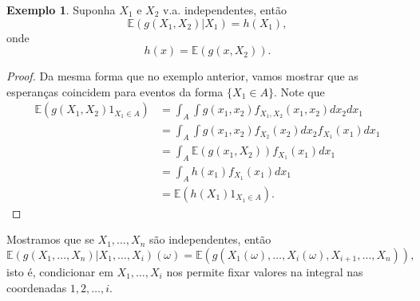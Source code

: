 \documentclass[12pt,a4paper,oneside]{book}
\theoremstyle{definition}
\newtheorem{example}[theorem]{Exemplo}
\theoremstyle{remark}
\numberwithin{equation}{section}
\newcommand{\E}{\mathbb{E}}
\newcommand{\pr}{\mathbb{P}}
\begin{document}
\begin{example}\label{exmp-condit-X1X2indp}
Suponha $X_1$ e $X_2$ v.a. independentes, então
$$\E(g(X_1,X_2)|X_1) = h(X_1), $$
onde 
$$h(x) = \E(g(x,X_2)).$$

\begin{proof}
Da mesma forma que no exemplo anterior, vamos mostrar que as esperanças coincidem para eventos da forma $\{ X_1\in A  \}$. Note que
\begin{align*}
\E(g(X_1,X_2)1_{X_1\in A}) &=  \int_A\int g(x_1,x_2)f_{X_1,X_2}(x_1,x_2)dx_2dx_1\\
	    &=  \int_A\int g(x_1,x_2)f_{X_2}(x_2)dx_2f_{X_1}(x_1)dx_1\\
        &=\int_A\E(g(x_1,X_2))f_{X_1}(x_1) dx_1\\        
        &= \int_A h(x_1)f_{X_1}(x_1)dx_1\\
        &=\E(h(X_1)1_{X_1\in A}).
\end{align*}

\end{proof}


\begin{tcolorbox}[colback = yellow!60]
Mostramos que se $X_1,\dots,X_n$ são independentes, então
$$\E(g(X_1,\dots,X_n)|X_1,\dots,X_i)(\omega) = \E(g(X_1(\omega),\dots,X_i(\omega),X_{i+1},\dots,X_n)), $$
isto é, condicionar em $X_1,\dots,X_i$ nos permite fixar valores na integral nas coordenadas $1,2,\dots,i$. 
\end{tcolorbox}



\end{example}

\end{document}
